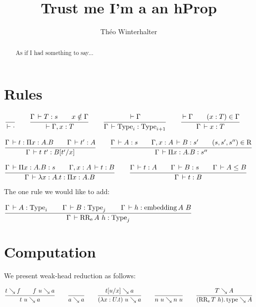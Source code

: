 \documentclass[a4paper,english]{lipics-utf8x}
\title{Trust me I'm a an hProp}
\author[1]{Théo Winterhalter}
\begin{document}
  \maketitle

  \begin{abstract}
    As if I had something to say...
  \end{abstract}

  \section{Rules}

  \begin{center}
  \(
    \ru{}{\der \cdot}
    \qquad
    \ru{\Gamma \der T : s \qquad
        x \notin \Gamma
      }{\der \Gamma, x : T}
    \qquad
    \ru{\der \Gamma
      }{\Gamma \der \Type_i : \Type_{i+1}}
    \qquad
    \ru{\der \Gamma \qquad
        (x : T) \in \Gamma
      }{\Gamma \der x : T}
  \)
  \end{center}

  \begin{center}
  \(
    \ru{\Gamma \der t : \Pi x:A.B \qquad
        \Gamma \der t' : A
      }{\Gamma \der t\ t' : B[t'/x]}
    \qquad
    \ru{\Gamma \der A : s \qquad
        \Gamma, x:A \der B : s' \qquad
        (s,s',s'') \in \R
      }{\Gamma \der \Pi x:A.B : s''}
  \)
  \end{center}

  \begin{center}
  \(
    \ru{\Gamma \der \Pi x:A.B : s \qquad
        \Gamma, x:A \der t : B
      }{\Gamma \der \lambda x:A.t : \Pi x:A.B}
    \qquad
    \ru{\Gamma \der t : A \qquad
        \Gamma \der B : s \qquad
        \Gamma \der A \le B
      }{\Gamma \der t : B}
  \)
  \end{center}

  The one rule we would like to add:

  \begin{center}
  \(
    \ru{\Gamma \der A : \Type_i \qquad
        \Gamma \der B : \Type_j \qquad
        \Gamma \der h : \emb{A}{B}
      }{\Gamma \der \RRe{A}{h} : \Type_j}
  \)
  \end{center}

\section{Computation}

We present weak-head reduction as follows:

\begin{center}
\(
  \ru{t \rew f \qquad
      f~u \rew a
    }{t~u \rew a}
  \qquad
  \ru{}{a \rew a}
  \qquad
  \ru{t[u/x] \rew a
    }{(\lambda x:U.t)~u \rew a}
  \qquad
  \ru{}{n~u \rew n~u}
  \qquad
  \ru{T \rew A
    }{(\RRe{T}{h}).\type \rew A}
\)
\end{center}
\end{document}
